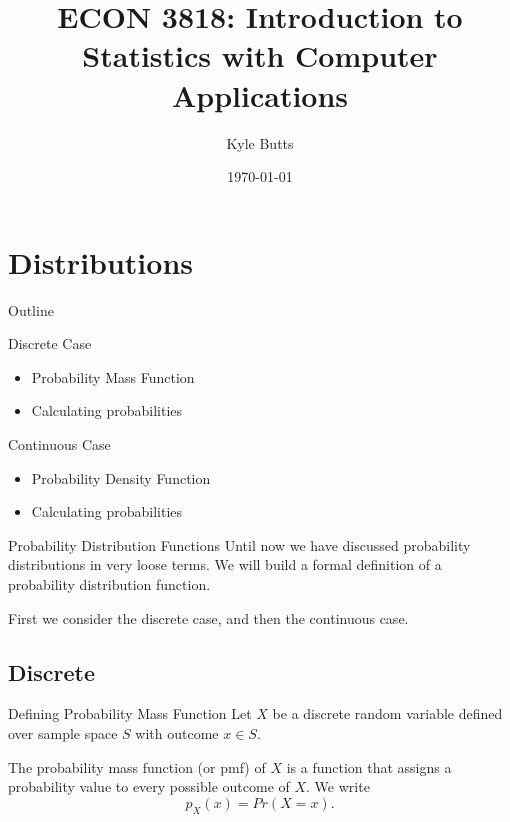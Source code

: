 \documentclass{beamer}
\title{ECON 3818: Introduction to Statistics with Computer Applications}
\date{\today}
\author{Kyle Butts}
\begin{document}
\maketitle

\section{Distributions}
\begin{frame}{Outline}
	
	Discrete Case
	\begin{itemize}
		\item Probability Mass Function
		\item Calculating probabilities
	\end{itemize}
	
	Continuous Case
	\begin{itemize}
		\item Probability Density Function
		\item Calculating probabilities
	\end{itemize}
	
\end{frame}


\begin{frame}{Probability Distribution Functions}
	Until now we have discussed probability distributions in very loose terms. We will build a formal definition of a \alert{probability distribution function}.
	
		
	First we consider the discrete case, and then the continuous case.
\end{frame}
\subsection{Discrete}
\begin{frame}{Defining Probability Mass Function}
	Let $X$ be a discrete random variable defined over sample space $S$ with outcome $x \in S$.

	\begin{definition}\vspace{2.5mm}
		The \alert{probability mass function} (or pmf) of $X$ is a function that assigns a probability value to every possible outcome of $X$. We write
		\[ p_X(x) = Pr(X=x). \]
	\end{definition}
\end{frame}
\end{document}
